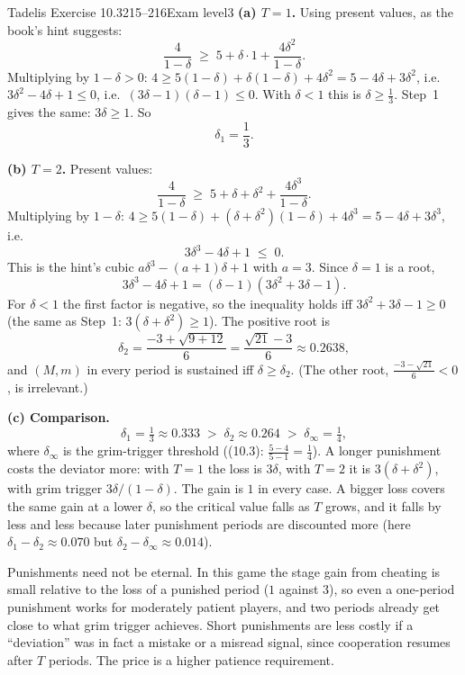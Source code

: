 \begin{exsol}{Tadelis Exercise 10.3}{215--216}{Exam level}{3}
\textbf{(a) $T = 1$.} Using present values, as the book's hint suggests:
\[
  \frac{4}{1-\delta} \;\ge\; 5 + \delta\cdot 1 + \frac{4\delta^2}{1-\delta}.
\]
Multiplying by $1 - \delta > 0$: $4 \ge 5(1-\delta) + \delta(1-\delta) + 4\delta^2 = 5 - 4\delta +
3\delta^2$, i.e.\ $3\delta^2 - 4\delta + 1 \le 0$, i.e.\ $(3\delta - 1)(\delta - 1) \le 0$. With
$\delta < 1$ this is $\delta \ge \frac13$. Step~1 gives the same: $3\delta \ge 1$. So
\[
  \delta_1 = \frac13 .
\]

\textbf{(b) $T = 2$.} Present values:
\[
  \frac{4}{1-\delta} \;\ge\; 5 + \delta + \delta^2 + \frac{4\delta^3}{1-\delta}.
\]
Multiplying by $1 - \delta$: $4 \ge 5(1-\delta) + (\delta + \delta^2)(1 - \delta) + 4\delta^3 = 5 - 4\delta +
3\delta^3$, i.e.
\[
  3\delta^3 - 4\delta + 1 \;\le\; 0 .
\]
This is the hint's cubic $a\delta^3 - (a+1)\delta + 1$ with $a = 3$. Since $\delta = 1$ is a root,
\[
  3\delta^3 - 4\delta + 1 = (\delta - 1)(3\delta^2 + 3\delta - 1).
\]
For $\delta < 1$ the first factor is negative, so the inequality holds iff $3\delta^2 + 3\delta - 1 \ge 0$
(the same as Step~1: $3(\delta + \delta^2) \ge 1$). The positive root is
\[
  \delta_2 = \frac{-3 + \sqrt{9 + 12}}{6} = \frac{\sqrt{21} - 3}{6} \approx 0.2638 ,
\]
and $(M,m)$ in every period is sustained iff $\delta \ge \delta_2$. (The other root,
$\frac{-3 - \sqrt{21}}{6} < 0$, is irrelevant.)

\textbf{(c) Comparison.}
\[
  \delta_1 = \tfrac13 \approx 0.333 \;>\; \delta_2 \approx 0.264 \;>\; \delta_\infty = \tfrac14 ,
\]
where $\delta_\infty$ is the grim-trigger threshold ((10.3): $\frac{5-4}{5-1} = \frac14$). A longer
punishment costs the deviator more: with $T = 1$ the loss is $3\delta$, with $T = 2$ it is $3(\delta +
\delta^2)$, with grim trigger $3\delta/(1-\delta)$. The gain is $1$ in every case. A bigger loss covers
the same gain at a lower $\delta$, so the critical value falls as $T$ grows, and it falls by less and
less because later punishment periods are discounted more (here $\delta_1 - \delta_2 \approx 0.070$ but
$\delta_2 - \delta_\infty \approx 0.014$).

\interp Punishments need not be eternal. In this game the stage gain from cheating is small
relative to the loss of a punished period ($1$ against $3$), so even a one-period punishment works for
moderately patient players, and two periods already get close to what grim trigger achieves. Short
punishments are less costly if a ``deviation'' was in fact a mistake or a misread signal, since
cooperation resumes after $T$ periods. The price is a higher patience requirement.


\end{exsol}

